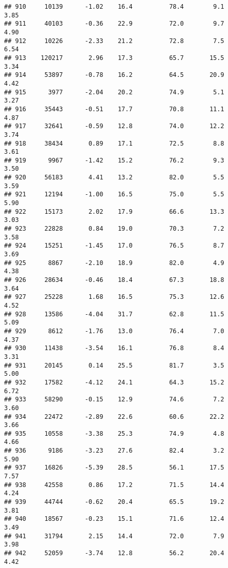 \documentclass[
]{article}
\begin{document}
\begin{verbatim}
## 910     10139      -1.02    16.4          78.4        9.1              3.85
## 911     40103      -0.36    22.9          72.0        9.7              4.90
## 912     10226      -2.33    21.2          72.8        7.5              6.54
## 913    120217       2.96    17.3          65.7       15.5              3.34
## 914     53897      -0.78    16.2          64.5       20.9              4.42
## 915      3977      -2.04    20.2          74.9        5.1              3.27
## 916     35443      -0.51    17.7          70.8       11.1              4.87
## 917     32641      -0.59    12.8          74.0       12.2              3.74
## 918     38434       0.89    17.1          72.5        8.8              3.61
## 919      9967      -1.42    15.2          76.2        9.3              3.50
## 920     56183       4.41    13.2          82.0        5.5              3.59
## 921     12194      -1.00    16.5          75.0        5.5              5.90
## 922     15173       2.02    17.9          66.6       13.3              3.03
## 923     22828       0.84    19.0          70.3        7.2              3.58
## 924     15251      -1.45    17.0          76.5        8.7              3.69
## 925      8867      -2.10    18.9          82.0        4.9              4.38
## 926     28634      -0.46    18.4          67.3       18.8              3.64
## 927     25228       1.68    16.5          75.3       12.6              4.52
## 928     13586      -4.04    31.7          62.8       11.5              5.09
## 929      8612      -1.76    13.0          76.4        7.0              4.37
## 930     11438      -3.54    16.1          76.8        8.4              3.31
## 931     20145       0.14    25.5          81.7        3.5              5.00
## 932     17582      -4.12    24.1          64.3       15.2              6.72
## 933     58290      -0.15    12.9          74.6        7.2              3.60
## 934     22472      -2.89    22.6          60.6       22.2              3.66
## 935     10558      -3.38    25.3          74.9        4.8              4.66
## 936      9186      -3.23    27.6          82.4        3.2              5.90
## 937     16826      -5.39    28.5          56.1       17.5              7.57
## 938     42558       0.86    17.2          71.5       14.4              4.24
## 939     44744      -0.62    20.4          65.5       19.2              3.81
## 940     18567      -0.23    15.1          71.6       12.4              3.49
## 941     31794       2.15    14.4          72.0        7.9              3.98
## 942     52059      -3.74    12.8          56.2       20.4              4.42

\end{verbatim}
\end{document}
